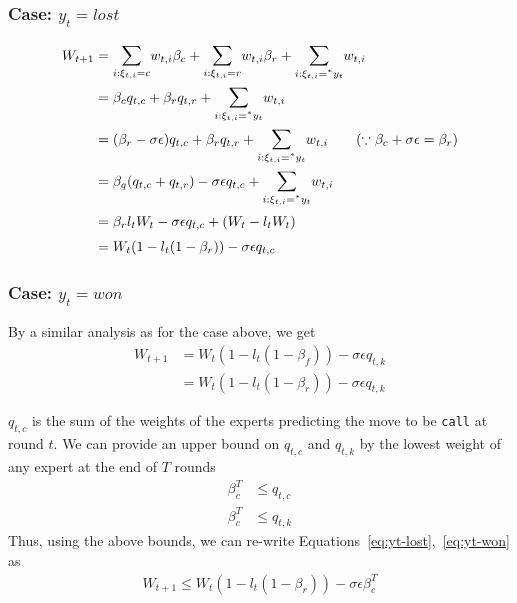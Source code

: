 \documentclass[12pt]{article}
\begin{document}
\subsubsection*{Case: $y_t = lost$}
\begin{align}
W_{t+1} &= \Sum_{i:\xi_{t,i}=c}w_{t,i}\beta_c + \Sum_{i:\xi_{t,i}=r}w_{t,i}\beta_r + \Sum_{i:\xi_{t,i}=^*y_t}w_{t,i}\tag*{}\\
&= \beta_cq_{t,c} + \beta_rq_{t,r} + \Sum_{i:\xi_{t,i}=^*y_t}w_{t,i}\tag*{}\\
&= (\beta_r-\sigma\epsilon)q_{t,c} + \beta_rq_{t,r} + \Sum_{i:\xi_{t,i}=^*y_t}w_{t,i}\tag{$\because \beta_c + \sigma\epsilon = \beta_r$}\\
&= \beta_q(q_{t,c}+q_{t,r}) - \sigma\epsilon q_{t,c} + \Sum_{i:\xi_{t,i}=^*y_t}w_{t,i}\tag*{}\\
&= \beta_rl_tW_t - \sigma\epsilon q_{t,c} + (W_t - l_tW_t)\tag*{}\\
&= W_t(1-l_t(1-\beta_r)) - \sigma\epsilon q_{t,c}
\label{eq:yt-lost}
\end{align}

\subsubsection*{Case: $y_t = won$}
By a similar analysis as for the case above, we get
\begin{align}
\label{eq:yt-won}
W_{t+1} &= W_t(1-l_t(1-\beta_f)) - \sigma\epsilon q_{t,k}\\
&= W_t(1-l_t(1-\beta_r)) - \sigma\epsilon q_{t,k}\tag{$\because \beta_r=\beta_f$ by assumption}
\end{align}

\noindent $q_{t,c}$ is the sum of the weights of the experts predicting the move to be \texttt{call}
at round $t$. We can provide an upper bound on $q_{t,c}$ and $q_{t,k}$ by the lowest weight of any expert at the end of
$T$ rounds \ie
\begin{align}
\label{eq:bound-qtc}
\beta_c^T&\leq q_{t,c}\\
\beta_c^T&\leq q_{t,k}
\label{eq:bound-qtk}
\end{align}
\noindent Thus, using the above bounds, we can re-write Equations~\ref{eq:yt-lost},~\ref{eq:yt-won} as
\begin{align}
W_{t+1} \leq W_t(1-l_t(1-\beta_r)) - \sigma\epsilon\beta_c^T
\label{eq:wt-plus1}
\end{align}
\end{document}
